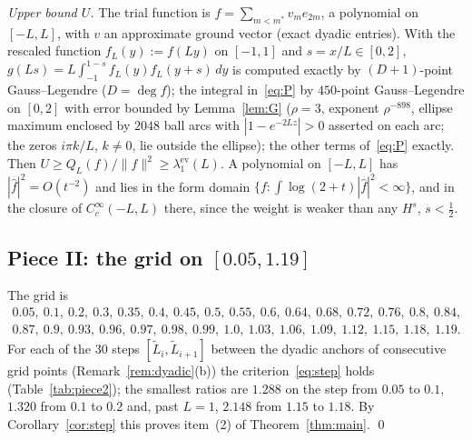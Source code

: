 \documentclass[11pt]{amsart}
\newcommand{\ev}{\mathrm{ev}}
\theoremstyle{definition}
\theoremstyle{remark}
\numberwithin{equation}{section}
\begin{document}
\emph{Upper bound $U$.} The trial function is $f=\sum_{m<m^*}v_me_{2m}$, a polynomial on $[-L,L]$, with $v$ an approximate ground vector (exact dyadic entries). With the rescaled function $f_L(y):=f(Ly)$ on $[-1,1]$ and $s=x/L\in[0,2]$, $g(Ls)=L\int_{-1}^{1-s}f_L(y)f_L(y+s)\,dy$ is computed exactly by $(D+1)$-point Gauss--Legendre ($D=\deg f$); the integral in~\eqref{eq:P} by $450$-point Gauss--Legendre on $[0,2]$ with error bounded by Lemma~\ref{lem:G} ($\rho=3$, exponent $\rho^{-898}$, ellipse maximum enclosed by $2048$ ball arcs with $|1-e^{-2Lz}|>0$ asserted on each arc; the zeros $i\pi k/L$, $k\neq0$, lie outside the ellipse); the other terms of~\eqref{eq:P} exactly. Then $U\ge Q_L(f)/\|f\|^2\ge\lambda_1^\ev(L)$. A polynomial on $[-L,L]$ has $|\hat f|^2=O(t^{-2})$ and lies in the form domain $\{f:\int\log(2+t)|\hat f|^2<\infty\}$, and in the closure of $C_c^\infty(-L,L)$ there, since the weight is weaker than any $H^s$, $s<\tfrac12$.

\subsection{Piece II: the grid on $[0.05,1.19]$}\label{sec:piece2}
The grid is
\begin{gather*}
0.05,\ 0.1,\ 0.2,\ 0.3,\ 0.35,\ 0.4,\ 0.45,\ 0.5,\ 0.55,\ 0.6,\ 0.64,\ 0.68,\ 0.72,\ 0.76,\ 0.8,\ 0.84,\\
0.87,\ 0.9,\ 0.93,\ 0.96,\ 0.97,\ 0.98,\ 0.99,\ 1.0,\ 1.03,\ 1.06,\ 1.09,\ 1.12,\ 1.15,\ 1.18,\ 1.19.
\end{gather*}
For each of the $30$ steps $[\tilde L_i,\tilde L_{i+1}]$ between the dyadic anchors of consecutive grid points (Remark~\ref{rem:dyadic}(b)) the criterion~\eqref{eq:step} holds (Table~\ref{tab:piece2}); the smallest ratios are $1.288$ on the step from $0.05$ to $0.1$, $1.320$ from $0.1$ to $0.2$ and, past $L=1$, $2.148$ from $1.15$ to $1.18$. By Corollary~\ref{cor:step} this proves item~(2) of Theorem~\ref{thm:main}. \qed
\end{document}
